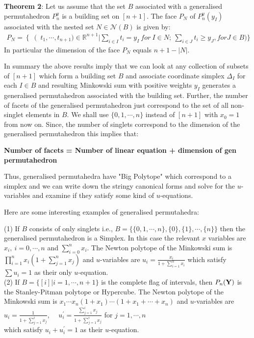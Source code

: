 \documentclass[hidelinks,12pt]{article}
\newcommand{\bea}[1]{\begin{eqnarray}\label{#1} }
\newcommand{\eea}{\end{eqnarray}}
\def\bea{\begin{eqnarray}}
\def\eea{\end{eqnarray}}
\begin{document}
{\bf Theorem 2}: Let us assume that the set $B$ associated with a generalised permutahedron $P_n^{y}$ is a building set on $[n+1]$. The face $P_N$ of $P_n^{y}(y_I)$ associated with the nested set $N \in \mathcal{N}(B)$ is given by:
\bea
P_N = \left \{ \right (t_1,\cdots,t_{n+1}) \in \mathbb{R}^{n+1} | \sum_{i \in I} t_i =y_{I}~for~I \in N; ~ \sum_{i \in J}t_i \geq y_J, for J \in B  )\}
\eea
In particular the dimension of the face $P_N$ equals $n+1-|N|$. 

In summary the above results imply that we can look at any collection of subsets of $[n+1]$ which form a building set $B$ and associate  coordinate simplex $\Delta_I$ for each $I \in B$ and resulting Minkowski sum with positive weights $y_I$ generates a generalised permutahedron associated with the building set. Further, the number of facets of the generalised permutahedron just correspond to the set of all non-singlet elements in $B$.  
We shall use $ \{0,1,\cdots,n \}$ instead of $[n+1]$ with $x_0 =1$ from now on. Since, the number of singlets correspond to the dimension of the generalised permutahedron this implies that:

{\bf Number of facets = Number of linear equation + dimension of  gen permutahedron}
 
Thus, generalised permutahedra have "Big Polytope" which correspond to a simplex and we can write down the stringy canonical forms and solve for the $u$-variables and examine if they satisfy some kind of $u$-equations.

Here are some interesting examples of generalised permutahedra:

(1) If $B$ consists of only singlets i.e., $B=\{ \{ 0,1,\cdots,n \}, \{ 0 \},\{ 1 \},\cdots ,\{ n \} \}$ then the generalised permutahedron is a Simplex. In this case the relevant $x$ variables are $x_i,~ i=0,\cdots,n$ and $\sum_{i=0}^n x_i$. 
The Newton polytope of the Minkowski sum is $\prod_{i=1}^{n} x_i (1+\sum_{j=1}^{n} x_j)$ and $u$-variables are 
$u_i =\frac{ x_i}{1+\sum_{i=1}^n x_i} $
which satisfy $\sum u_i =1$ as their only $u$-equation. \\

(2) If $B= \{[i] | i=1,\cdots,n+1 \}$ is the complete flag of intervals, then $P_n({\bf Y})$ is the Stanley-Pitman polytope or Hypercube.
The Newton polytope of the Minkowski sum is $x_1\cdots x_n (1+x_1) \cdots (1+x_1+\cdots +x_n)$ and $u$-variables are 
$u_i =\frac{ 1}{1+\sum_{j=1}^{i} x_j} $, ~~$u^{'}_i =\frac{ \sum_{j=1}^{i} x_j}{1+\sum_{j=1}^{i} x_j} $ for $j=1,\cdots,n$ \\
which satisfy $u_i +u^{'}_{i} =1$ as their $u$-equation. \\
\end{document}
